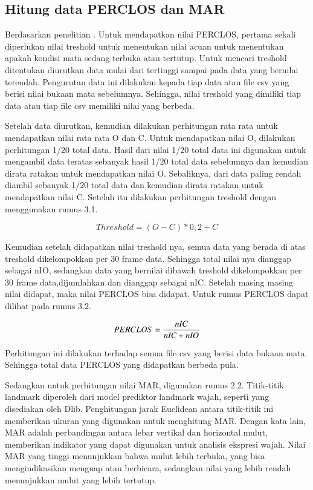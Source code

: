 \subsection{Hitung data PERCLOS dan MAR}
\label{subsec:HitungPERCLOS}
 Berdasarkan penelitian \parencite{7545182}. Untuk mendapatkan nilai PERCLOS, pertama sekali diperlukan nilai treshold untuk menentukan nilai acuan untuk menentukan apakah kondisi mata sedang terbuka atau tertutup. Untuk mencari treshold ditentukan diurutkan data mulai dari tertinggi sampai pada data yang bernilai terendah. Pengurutan data ini dilakukan kepada tiap data atau file csv yang berisi nilai bukaan mata sebelumnya. Sehingga, nilai treshold yang dimiliki tiap data atau tiap file csv memiliki nilai yang berbeda.

 Setelah data diurutkan, kemudian dilakukan perhitungan rata rata untuk mendapatkan nilai rata rata O dan C. Untuk mendapatkan nilai O, dilakukan perhitungan 1/20 total data. Hasil dari nilai 1/20 total data ini digunakan untuk mengambil data teratas sebanyak hasil 1/20 total data sebelumnya dan kemudian dirata ratakan untuk mendapatkan nilai O. Sebaliknya, dari data paling rendah diambil sebanyak 1/20 total data dan kemudian dirata ratakan untuk mendapatkan nilai C. Setelah itu dilakukan perhitungan treshold dengan menggunakan rumus 3.1.

 \begin{equation}
  Threshold = (O - C)* 0,2 + C
\end{equation}


Kemudian setelah didapatkan nilai treshold nya, semua data yang berada di atas treshold dikelompokkan per 30 frame data. Sehingga total nilai nya dianggap sebagai nIO, sedangkan data yang bernilai dibawah treshold dikelompokkan per 30 frame data,dijumlahkan dan dianggap sebagai nIC. Setelah masing masing nilai didapat, maka nilai PERCLOS bisa didapat. Untuk rumus PERCLOS dapat dilihat pada rumus 3.2. 

\begin{equation}
\label{eq:PERCLOSeq}
  PERCLOS = \frac{\emph{nIC} }{\emph{nIC} + \emph{nIO}}
\end{equation}

Perhitungan ini dilakukan terhadap semua file csv yang berisi data bukaan mata. Sehingga total data PERCLOS yang didapatkan berbeda pula.

Sedangkan untuk perhitungan nilai MAR, digunakan rumus 2.2. Titik-titik landmark diperoleh dari model prediktor landmark wajah, seperti yang disediakan oleh Dlib. Penghitungan jarak Euclidean antara titik-titik ini memberikan ukuran yang digunakan untuk menghitung MAR. Dengan kata lain, MAR adalah perbandingan antara lebar vertikal dan horizontal mulut, memberikan indikator yang dapat digunakan untuk analisis ekspresi wajah. Nilai MAR yang tinggi menunjukkan bahwa mulut lebih terbuka, yang bisa mengindikasikan menguap atau berbicara, sedangkan nilai yang lebih rendah menunjukkan mulut yang lebih tertutup. 

